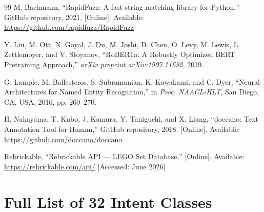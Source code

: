 \documentclass[12pt, a4paper]{report}
\begin{document}
\begin{thebibliography}{99}
M. Bachmann,
``RapidFuzz: A fast string matching library for Python,''
GitHub repository, 2021.
[Online]. Available: \url{https://github.com/rapidfuzz/RapidFuzz}

Y. Liu, M. Ott, N. Goyal, J. Du, M. Joshi, D. Chen, O. Levy,
M. Lewis, L. Zettlemoyer, and V. Stoyanov,
``RoBERTa: A Robustly Optimized BERT Pretraining Approach,''
\textit{arXiv preprint arXiv:1907.11692}, 2019.

G. Lample, M. Ballesteros, S. Subramanian, K. Kawakami, and C. Dyer,
``Neural Architectures for Named Entity Recognition,''
in \textit{Proc. NAACL-HLT}, San Diego, CA, USA, 2016, pp. 260--270.

H. Nakayama, T. Kubo, J. Kamura, Y. Taniguchi, and X. Liang,
``doccano: Text Annotation Tool for Human,''
GitHub repository, 2018.
[Online]. Available: \url{https://github.com/doccano/doccano}

Rebrickable,
``Rebrickable API --- LEGO Set Database,''
[Online]. Available: \url{https://rebrickable.com/api/}
[Accessed: June 2026]

\end{thebibliography}

\appendix

\chapter{Full List of 32 Intent Classes}
\label{app:intents}
\end{document}
